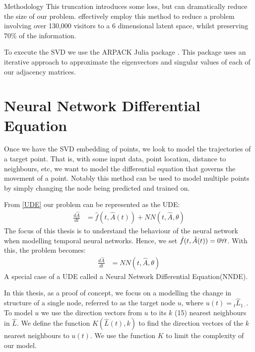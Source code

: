 \documentclass[12pt]{amsbook}
\begin{document}
\begin{chapter}{Methodology}
            This truncation introduces some loss, but can dramatically reduce the size of our problem. \cite{Runghen2021} effectively employ this method to reduce a problem involving over 130,000 visitors to a 6 dimensional latent space, whilst preserving 70\% of the information.

            To execute the SVD we use the ARPACK Julia package \cite{lehoucq1998arpack}. This package uses an iterative approach to approximate the eigenvectors and singular values of each of our adjacency matrices\cite{lehoucq1996deflation}.    

    \section{Neural Network Differential Equation}
        Once we have the SVD embedding of points, we look to model the trajectories of a target point. That is, with some input data, point location, distance to neighbours, etc, we want to model the differential equation that governs the movement of a point. 
        Notably this method can be used to model multiple points by simply changing the node being predicted and trained on. 
            
        From \cref{UDE} our problem can be represented as the UDE:
        \begin{align}
            \frac{d \hat A}{dt} &= \hat f(t,\hat A(t)) + NN(t, \hat A, \theta)
        \end{align}
        The focus of this thesis is to understand the behaviour of the neural network when modelling temporal neural networks. Hence, we set $\hat f(t, \hat A(t))=0 \space \forall t$. With this, the problem becomes:
        \begin{align}
            \frac{d \hat A}{dt} &= NN(t, \hat A, \theta)
        \end{align}
        A special case of a UDE called a Neural Network Differential Equation(NNDE).

        In this thesis, as a proof of concept, we focus on a modelling the change in structure of a single node, referred to as the target node $u$, where $u(t)={_t}\hat L_{1\cdot}$. To model $u$ we use the direction vectors from $u$ to its $k$ (15) nearest neighbours in $\hat L$. We define the function $K(\hat L(t), k)$ to find the direction vectors of the $k$ nearest neighbours to $u(t)$. We use the function $K$ to limit the complexity of our model.


\end{chapter}
\end{document}
